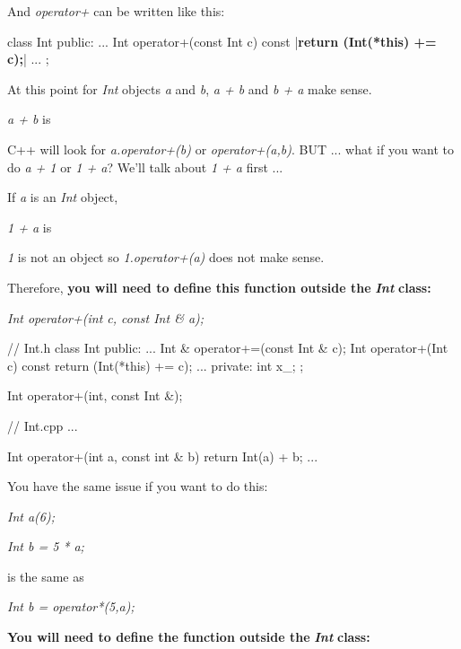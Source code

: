 And \textit{operator+} can be written like this:

\begin{consolethree}[escapeinside=||]
class Int
{
public:
    ...
    Int operator+(const Int c) const
    {
        |{\bf return (Int(*this) += c);}|
    }
    ...
};
\end{consolethree}


\newpage{}

At this point for \textit{Int} objects \textit{a} and \textit{b}, \textit{a + b}
and \textit{b + a} make sense.

\textit{a + b} is

C++ will look for \textit{a.operator+(b)} or \textit{operator+(a,b)}. BUT
... what if you want to do \textit{a + 1} or \textit{1 + a}? We'll talk
about \textit{1 + a} first ...

If \textit{a} is an \textit{Int} object,

\textit{1 + a} is

\textit{1} is not an object so \textit{1.operator+(a)} does not make sense.

Therefore, \textbf{you will need to define this function outside the
}\textit{\textbf{Int}}\textbf{ class:}

\textit{Int operator+(int c, const Int \& a);}

\begin{consolethree}[escapeinside=||]
// Int.h
class Int
{
public:
    ...
    Int & operator+=(const Int & c);
    Int operator+(Int c) const
    {
        return (Int(*this) += c);
    }
    ...
private:
    int x_;
};

Int operator+(int, const Int &);
\end{consolethree}

\begin{consolethree}[escapeinside=||]
// Int.cpp
...

Int operator+(int a, const int & b)
{
    return Int(a) + b;
}
...
\end{consolethree}

You have the same issue if you want to do this:

\textit{Int a(6);}

\textit{Int b = 5 * a;}

is the same as

\textit{Int b = operator*(5,a);}

\textbf{You will need to define the function outside the
}\textit{\textbf{Int}}\textbf{ class:}

